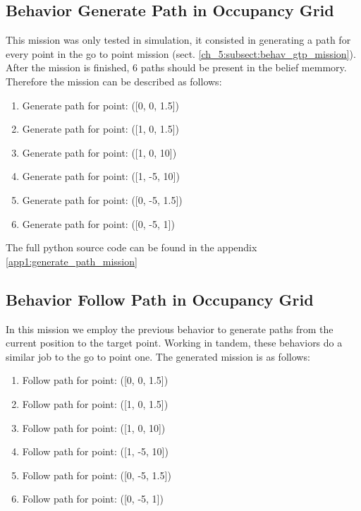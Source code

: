   \subsection{Behavior Generate Path in Occupancy Grid} \label{ch_5:subsect:behav_genpath_mission}

    This mission was only tested in simulation, it consisted in generating a path for every point in the go to point mission (sect. \ref{ch_5:subsect:behav_gtp_mission}). After the mission is finished, $6$ paths should be present in the belief memmory. Therefore the mission can be described as follows:
    
    \begin{enumerate}
      \item Generate path for point: ([0, 0, 1.5])
      \item Generate path for point: ([1, 0, 1.5])
      \item Generate path for point: ([1, 0, 10])
      \item Generate path for point: ([1, -5, 10])
      \item Generate path for point: ([0, -5, 1.5])
      \item Generate path for point: ([0, -5, 1])
    \end{enumerate}

    The full python source code can be found in the appendix \ref{app1:generate_path_mission}

  \subsection{Behavior Follow Path in Occupancy Grid} \label{ch_5:subsect:behav_fpath_mission}

    In this mission we employ the previous behavior to generate paths from the current position to the target point. Working in tandem, these behaviors do a similar job to the go to point one. The generated mission is as follows:

    \begin{enumerate}
      \item Follow path for point: ([0, 0, 1.5])
      \item Follow path for point: ([1, 0, 1.5])
      \item Follow path for point: ([1, 0, 10])
      \item Follow path for point: ([1, -5, 10])
      \item Follow path for point: ([0, -5, 1.5])
      \item Follow path for point: ([0, -5, 1])
    \end{enumerate}

